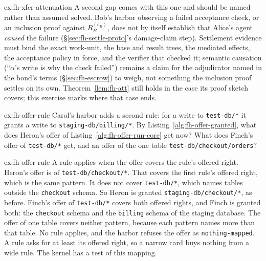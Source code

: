 \documentclass[11pt,a4paper]{article}
\theoremstyle{definition}
\theoremstyle{remark}
\begin{document}
\begin{pdsolution}{ex:fh-xfer-attenuation}
A second gap comes with this one and should be named rather than assumed solved. Bob's harbor observing a failed acceptance check, or an inclusion proof against $R_B^{(e_B)}$, does not by itself establish that Alice's agent \emph{caused} the failure (\S\ref{sec:fh-settle-proto}'s damage-claim step). Settlement evidence must bind the exact work-unit, the base and result trees, the mediated effects, the acceptance policy in force, and the verifier that checked it; semantic causation (``$\alpha$'s write is why the check failed'') remains a claim for the adjudicator named in the bond's terms (\S\ref{sec:fh-escrow}) to weigh, not something the inclusion proof settles on its own. Theorem~\ref{lem:fh-att} still holds in the case its proof sketch covers; this exercise marks where that case ends.
\end{pdsolution}


\begin{pdexercise}[kind=Check,rating=1]{ex:fh-offer-rule}
Carol's harbor adds a second rule: for a write to \texttt{test-db/*} it
grants a write to \texttt{staging-db/billing/*}. By
Listing~\ref{alg:fh-offer-granted}, what does Heron's offer of
Listing~\ref{alg:fh-offer-run-core} get now? What does Finch's offer of
\texttt{test-db/*} get, and an offer of the one table
\texttt{test-db/checkout/orders}?
\end{pdexercise}
\begin{pdsolution}{ex:fh-offer-rule}
A rule applies when the offer covers the rule's offered right. Heron's
offer is of \texttt{test-db/checkout/*}. That covers the first rule's
offered right, which is the same pattern. It does not cover
\texttt{test-db/*}, which names tables outside the \texttt{checkout}
schema. So Heron is granted \texttt{staging-db/checkout/*}, as before.
Finch's offer of \texttt{test-db/*} covers both offered rights, and Finch
is granted both: the \texttt{checkout} schema and the \texttt{billing}
schema of the staging database. The offer of one table covers neither
pattern, because each pattern names more than that table. No rule
applies, and the harbor refuses the offer as \texttt{nothing-mapped}. A
rule asks for at least its offered right, so a narrow card buys nothing
from a wide rule. The kernel has a test of this mapping.
\end{pdsolution}
\end{document}
